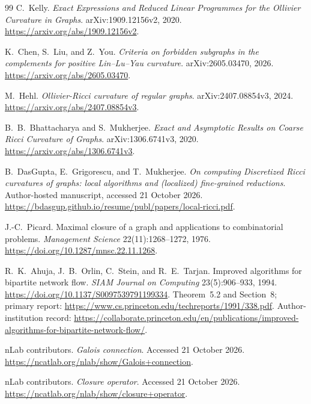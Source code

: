 \documentclass[11pt]{article}
\theoremstyle{remark}
\begin{document}
\begin{thebibliography}{99}
C.~Kelly.
\emph{Exact Expressions and Reduced Linear Programmes for the Ollivier Curvature in Graphs}.
arXiv:1909.12156v2, 2020.
\url{https://arxiv.org/abs/1909.12156v2}.

K.~Chen, S.~Liu, and Z.~You.
\emph{Criteria on forbidden subgraphs in the complements for positive Lin--Lu--Yau curvature}.
arXiv:2605.03470, 2026.
\url{https://arxiv.org/abs/2605.03470}.

M.~Hehl.
\emph{Ollivier-Ricci curvature of regular graphs}.
arXiv:2407.08854v3, 2024.
\url{https://arxiv.org/abs/2407.08854v3}.

B.~B.~Bhattacharya and S.~Mukherjee.
\emph{Exact and Asymptotic Results on Coarse Ricci Curvature of Graphs}.
arXiv:1306.6741v3, 2020.
\url{https://arxiv.org/abs/1306.6741v3}.

B.~DasGupta, E.~Grigorescu, and T.~Mukherjee.
\emph{On computing Discretized Ricci curvatures of graphs: local algorithms and (localized) fine-grained reductions}.
Author-hosted manuscript, accessed 21 October 2026.
\url{https://bdasgup.github.io/resume/publ/papers/local-ricci.pdf}.

J.-C.~Picard.
Maximal closure of a graph and applications to combinatorial problems.
\emph{Management Science} 22(11):1268--1272, 1976.
\url{https://doi.org/10.1287/mnsc.22.11.1268}.

R.~K.~Ahuja, J.~B.~Orlin, C.~Stein, and R.~E.~Tarjan.
Improved algorithms for bipartite network flow.
\emph{SIAM Journal on Computing} 23(5):906--933, 1994.
\url{https://doi.org/10.1137/S0097539791199334}.
Theorem~5.2 and Section~8; primary report:
\url{https://www.cs.princeton.edu/techreports/1991/338.pdf}.
Author-institution record:
\url{https://collaborate.princeton.edu/en/publications/improved-algorithms-for-bipartite-network-flow/}.

nLab contributors. \emph{Galois connection}.
Accessed 21 October 2026.
\url{https://ncatlab.org/nlab/show/Galois+connection}.

nLab contributors. \emph{Closure operator}.
Accessed 21 October 2026.
\url{https://ncatlab.org/nlab/show/closure+operator}.
\end{thebibliography}
\end{document}
